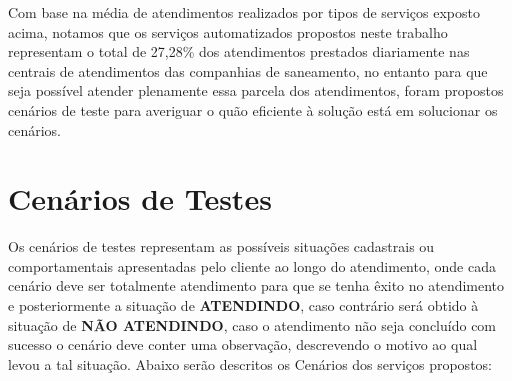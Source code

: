 Com base na média de atendimentos realizados por tipos de serviços exposto acima, notamos que os serviços automatizados propostos neste trabalho representam o total de 27,28\% dos atendimentos prestados diariamente nas centrais de atendimentos das companhias de saneamento, no entanto para que seja possível atender plenamente essa parcela dos atendimentos, foram propostos cenários de teste para averiguar o quão eficiente à solução está em solucionar os cenários.




\section{Cenários de Testes}

Os cenários de testes representam as possíveis situações cadastrais ou comportamentais apresentadas pelo cliente ao longo do atendimento, onde cada cenário deve ser totalmente atendimento para que se tenha êxito no atendimento e posteriormente a situação de \textbf{ATENDINDO}, caso contrário será obtido à situação de \textbf{NÃO ATENDINDO}, caso o atendimento não seja concluído com sucesso o cenário deve conter uma observação, descrevendo o motivo ao qual levou a tal situação.
Abaixo serão descritos os Cenários dos serviços propostos:

